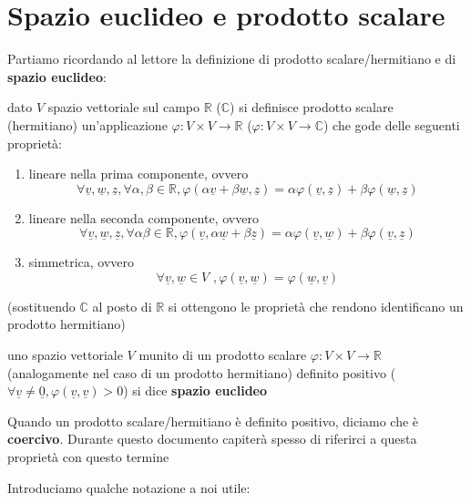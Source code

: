 \documentclass[openany]{book}
\begin{document}
	\section{Spazio euclideo e prodotto scalare}
	Partiamo ricordando al lettore la definizione di prodotto scalare/hermitiano e di \textbf{spazio euclideo}:
	\begin{definition}
	dato $V$ spazio vettoriale sul campo $\mathbb{R}$ ($\mathbb{C}$) si definisce prodotto scalare (hermitiano) un'applicazione $\varphi: V \times V \to \mathbb{R}$ ($\varphi: V \times V \to \mathbb{C}$) che gode delle seguenti proprietà:
	\begin{enumerate}[label=\protect\circled{\arabic*}]
		\item lineare nella prima componente, ovvero
		$$
		\forall \underline{v}, \underline{w}, \underline{z}, \forall \alpha, \beta \in \mathbb{R}, \varphi(\alpha \underline{v} + \beta \underline{w}, \underline{z}) = \alpha \varphi(\underline{v}, \underline{z}) + \beta \varphi(\underline{w}, \underline{z})
		$$
		\item lineare nella seconda componente, ovvero
		$$
		\forall \underline{v}, \underline{w}, \underline{z}, \forall \alpha \beta \in \mathbb{R}, \varphi(\underline{v}, \alpha \underline{w} + \beta \underline{z}) = \alpha \varphi(\underline{v}, \underline{w}) + \beta \varphi(\underline{v}, \underline{z})
		$$
		\item simmetrica, ovvero
		$$
		\forall \underline{v}, \underline{w} \in V \, \, , \varphi(\underline{v}, \underline{w}) = \varphi(\underline{w}, \underline{v})
		$$
	\end{enumerate}
	(sostituendo $\mathbb{C}$ al posto di $\mathbb{R}$ si ottengono le proprietà che rendono identificano un prodotto hermitiano)
	\end{definition}
	\begin{definition}
		uno spazio vettoriale $V$ munito di un prodotto scalare $\varphi: V \times V \to \mathbb{R}$ (analogamente nel caso di un prodotto hermitiano) definito positivo ($\forall \underline{v} \neq \underline{0}, \varphi(\underline{v}, \underline{v}) > 0$) si dice \textbf{spazio euclideo}
	\end{definition}
	\begin{remark}
	Quando un prodotto scalare/hermitiano è definito positivo, diciamo che è \textbf{coercivo}. Durante questo documento capiterà spesso di riferirci a questa proprietà con questo termine
	\end{remark}
	\noindent Introduciamo qualche notazione a noi utile:
\end{document}
